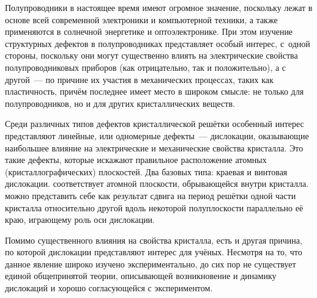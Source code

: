 \documentclass[a4paper, 14pt, titlepage]{extarticle}
\author{\theauthor,\\ кафедра физики и информационных систем КубГУ}
\title{\thetitle}
\date{\today{} \currenttime}
\begin{document}

  \maketitle
  \newpage


    \clearpage
    \tableofcontents


  \label{sec:intro}

  Полупроводники в настоящее время имеют огромное значение, поскольку лежат в основе всей
  современной электроники и компьютерной техники, а также применяются в солнечной энергетике и
  оптоэлектронике. При этом изучение структурных дефектов в полупроводниках представляет особый
  интерес, с~одной стороны, поскольку они могут существенно влиять на электрические свойства
  полупроводниковых приборов (как отрицательно, так и положительно), а с другой~--- по причине их
  участия в механических процессах, таких как пластичность, причём последнее имеет место в широком
  смысле: не только для полупроводников, но и для других кристаллических веществ.

  Среди различных типов дефектов кристаллической решётки особенный интерес представляют линейные,
  или одномерные дефекты~--- дислокации, оказывающие наибольшее влияние на электрические и
  механические свойства кристалла. Это такие дефекты, которые искажают правильное расположение
  атомных (кристаллографических) плоскостей. Два базовых типа: краевая и винтовая дислокации.
   соответствует атомной плоскости, обрывающейся внутри кристалла.
   можно представить себе как результат сдвига на период решётки одной
  части кристалла относительно другой вдоль некоторой полуплоскости параллельно её краю, играющему
  роль оси дислокации. %

  Помимо существенного влияния на свойства кристалла, есть и другая причина, по которой
  дислокации представляют интерес для учёных. Несмотря на то, что данное явление широко изучено
  экспериментально, до сих пор не существует единой общепринятой теории, описывающей возникновение и
  динамику дислокаций и хорошо согласующейся с экспериментом.
\end{document}
